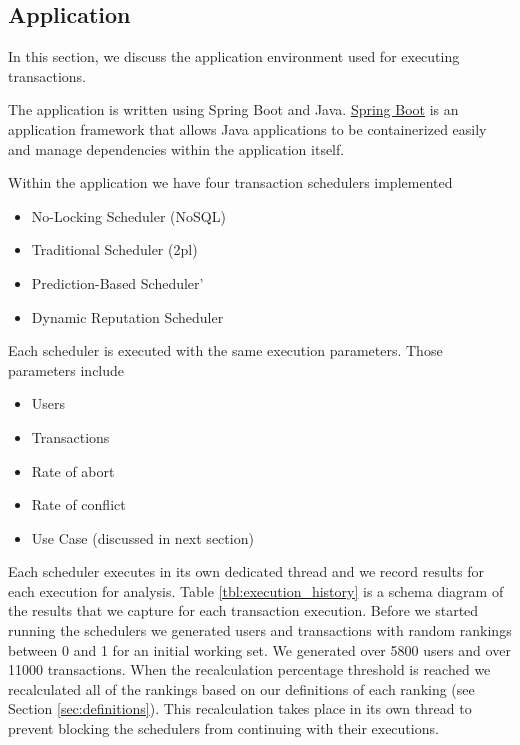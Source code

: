 \subsection{Application}
\label{sec:er_application}

In this section, we discuss the application environment used for executing transactions.

The application is written using Spring Boot and Java.
\href{https://spring.io/projects/spring-boot}{Spring Boot} is an application framework that allows Java applications to be containerized easily and manage dependencies within the application itself.

Within the application we have four transaction schedulers implemented

\begin{itemize}
  \item No-Locking Scheduler (NoSQL)
  \item Traditional Scheduler (\gls{2pl})
  \item Prediction-Based Scheduler'
  \item Dynamic Reputation Scheduler
\end{itemize}

Each scheduler is executed with the same execution parameters. Those parameters include

\begin{itemize}
    \item Users
    \item Transactions
    \item Rate of abort
    \item Rate of conflict
    \item Use Case (discussed in next section)
\end{itemize}

Each scheduler executes in its own dedicated thread and we record results for each execution for analysis. Table \ref{tbl:execution_history} is a schema diagram of the results that we capture for each transaction execution. Before we started running the schedulers we generated users and transactions with random rankings between 0 and 1 for an initial working set. We generated over 5800 users and over 11000 transactions.  When the recalculation percentage threshold is reached we recalculated all of the rankings based on our definitions of each ranking (see Section \ref{sec:definitions}). This recalculation takes place in its own thread to prevent blocking the schedulers from continuing with their executions.

